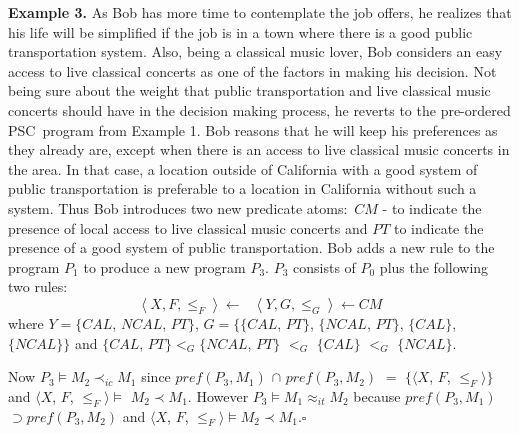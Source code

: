 \documentclass[letterpaper]{article}\usepackage{aaai}
\begin{document}
\textbf{Example 3.}\label{Ex3} As Bob has more time to contemplate the job
offers, he realizes that his life will be simplified if the job is in a town
where there is a good public transportation system. Also, being a classical
music lover, Bob considers an easy access to live classical concerts as one of
the factors in making his decision. Not being sure about the weight that
public transportation and live classical music concerts should have in the
decision making process, he reverts to the pre-ordered PSC\ program from
Example 1. Bob reasons that he will keep his preferences as they already are,
except when there is an access to live classical music concerts in the area.
In that case, a location outside of California with a good system of public
transportation is preferable to a location in California without such a
system. Thus Bob introduces two new predicate atoms:\ $CM$ - to indicate the
presence of local access to live classical music concerts and $PT$ to indicate
the presence of a good system of public transportation. Bob adds a new rule to
the program $P_{1}$ to produce a new program $P_{3}$. $P_{3}$ consists of
$P_{0}$ plus the following two rules:
\[
\left\langle X,F,\leq_{F}\right\rangle \leftarrow\text{ \ \ \ }\left\langle
Y,G,\leq_{G}\right\rangle \leftarrow CM
\]
where $Y=\{CAL$, $NCAL$, $PT\}$, $G=\{\{CAL$, $PT\}$, $\{NCAL$, $PT\}$,
$\{CAL\}$, $\{NCAL\}\}$ and $\{CAL$, $PT\}<_{G}\{NCAL$, $PT\}$ $<_{G}$
$\{CAL\}$ $<_{G}$ $\{NCAL\}$.

Now $P_{3}\models M_{2}\prec_{ic}M_{1}$ since $pref\left(  P_{3},M_{1}\right)
$ $\cap$ $pref\left(  P_{3},M_{2}\right)  $ $=$ $\{\langle X$, $F$, $\leq
_{F}\rangle\}$ and $\langle X$, $F$, $\leq_{F}\rangle\models$ $M_{2}\prec
M_{1}$. However $P_{3}\models M_{1}\approx_{it}M_{2}$ because $pref\left(
P_{3},M_{1}\right)  $ $\supset pref\left(  P_{3},M_{2}\right)  $ and $\langle
X$, $F$, $\leq_{F}\rangle\models M_{2}\prec M_{1}.\square$\newline
\end{document}

